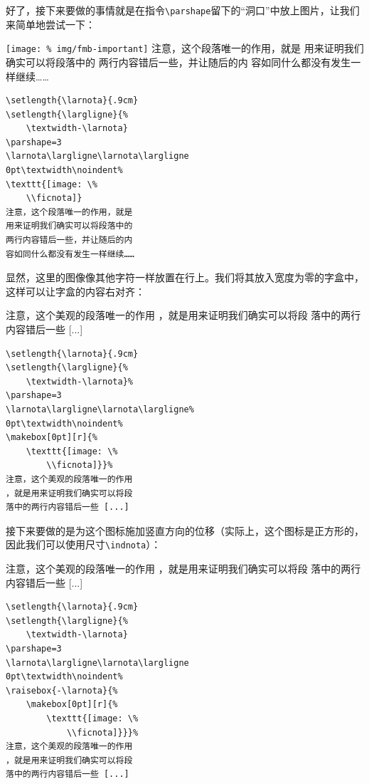 好了，接下来要做的事情就是在指令\verb|\parshape|留下的“洞口”中放上图片，让我们来简单地尝试一下：

\begin{codelist}[11.7]{
\setlength{\larnota}{.9cm}
\setlength{\largligne}{%
    \textwidth-\larnota}
\larnota\largligne\larnota\largligne
0pt\textwidth\noindent%
\texttt{[image: \%
img/fmb-important]}
注意，这个段落唯一的作用，就是
用来证明我们确实可以将段落中的
两行内容错后一些，并让随后的内
容如同什么都没有发生一样继续……
}\begin{verbatim}
\setlength{\larnota}{.9cm}
\setlength{\largligne}{%
    \textwidth-\larnota}
\parshape=3
\larnota\largligne\larnota\largligne
0pt\textwidth\noindent%
\texttt{[image: \%
    \\ficnota]}
注意，这个段落唯一的作用，就是
用来证明我们确实可以将段落中的
两行内容错后一些，并让随后的内
容如同什么都没有发生一样继续……
\end{verbatim}
\end{codelist}

显然，这里的图像像其他字符一样放置在行上。我们将其放入宽度为零的字盒中，这样可以让字盒的内容右对齐：

\begin{codelist}[11.7]{
\setlength{\larnota}{.9cm}
\setlength{\largligne}{%
    \textwidth-\larnota}%
\larnota\largligne\larnota\largligne%
0pt\textwidth\noindent%
%
注意，这个美观的段落唯一的作用
，就是用来证明我们确实可以将段
落中的两行内容错后一些 [...]
}\begin{verbatim}
\setlength{\larnota}{.9cm}
\setlength{\largligne}{%
    \textwidth-\larnota}%
\parshape=3
\larnota\largligne\larnota\largligne%
0pt\textwidth\noindent%
\makebox[0pt][r]{%
    \texttt{[image: \%
        \\ficnota]}}%
注意，这个美观的段落唯一的作用
，就是用来证明我们确实可以将段
落中的两行内容错后一些 [...]
\end{verbatim}
\end{codelist}

接下来要做的是为这个图标施加竖直方向的位移（实际上，这个图标是正方形的，因此我们可以使用尺寸\verb|\indnota|）：

\begin{codelist}[11.9]{
\setlength{\larnota}{.9cm}
\setlength{\largligne}{%
    \textwidth-\larnota}
\larnota\largligne\larnota\largligne
0pt\textwidth\noindent%
%
注意，这个美观的段落唯一的作用
，就是用来证明我们确实可以将段
落中的两行内容错后一些 [...]
}\begin{verbatim}
\setlength{\larnota}{.9cm}
\setlength{\largligne}{%
    \textwidth-\larnota}
\parshape=3
\larnota\largligne\larnota\largligne
0pt\textwidth\noindent%
\raisebox{-\larnota}{%
    \makebox[0pt][r]{%
        \texttt{[image: \%
            \\ficnota]}}}%
注意，这个美观的段落唯一的作用
，就是用来证明我们确实可以将段
落中的两行内容错后一些 [...]
\end{verbatim}
\end{codelist}

